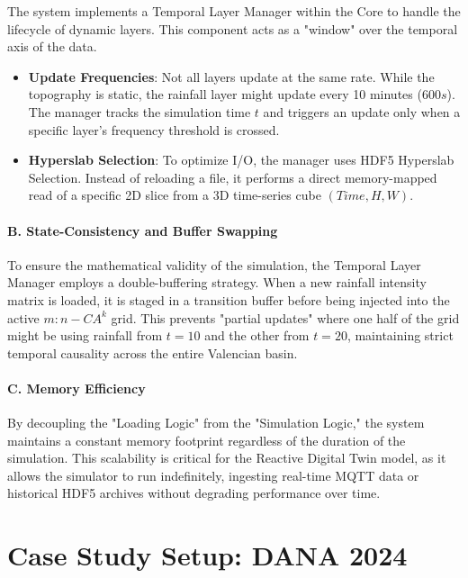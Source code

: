 The system implements a Temporal Layer Manager within the Core to handle the lifecycle of dynamic layers. This component acts as a 
"window" over the temporal axis of the data.

\begin{itemize}
    \item \textbf{Update Frequencies}: Not all layers update at the same rate. While the topography is static, the rainfall layer might update every 10 minutes ($600s$). The manager tracks the simulation time $t$ and triggers an update only when a specific layer's frequency threshold is crossed.

    \item \textbf{Hyperslab Selection}: To optimize I/O, the manager uses HDF5 Hyperslab Selection. Instead of reloading a file, it performs a direct memory-mapped read of a specific 2D slice from a 3D time-series cube $(Time, H, W)$.
\end{itemize}

\paragraph{B. State-Consistency and Buffer Swapping}

To ensure the mathematical validity of the simulation, the Temporal Layer Manager employs a double-buffering strategy. When a new 
rainfall intensity matrix is loaded, it is staged in a transition buffer before being injected into the active $m:n-CA^k$ grid. This 
prevents "partial updates" where one half of the grid might be using rainfall from $t=10$ and the other from $t=20$, maintaining strict 
temporal causality across the entire Valencian basin.

\paragraph{C. Memory Efficiency}

By decoupling the "Loading Logic" from the "Simulation Logic," the system maintains a constant memory footprint regardless of the 
duration of the simulation. This scalability is critical for the Reactive Digital Twin model, as it allows the simulator to run 
indefinitely, ingesting real-time MQTT data or historical HDF5 archives without degrading performance over time.


\section{Case Study Setup: DANA 2024}

